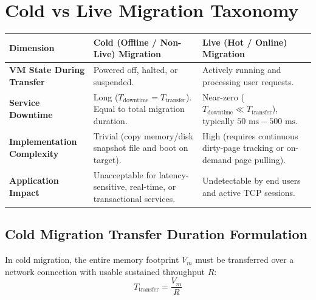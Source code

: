 \section{Cold vs Live Migration Taxonomy}
\begin{center}
\begin{tabularx}{\textwidth}{>{\bfseries}l X X}
\toprule
Dimension & Cold (Offline / Non-Live) Migration & Live (Hot / Online) Migration\\
\midrule
VM State During Transfer & Powered off, halted, or suspended. & Actively running and processing user requests.\\
Service Downtime & Long ($T_{\text{downtime}} = T_{\text{transfer}}$). Equal to total migration duration. & Near-zero ($T_{\text{downtime}} \ll T_{\text{transfer}}$), typically $50\text{ ms} - 500\text{ ms}$.\\
Implementation Complexity & Trivial (copy memory/disk snapshot file and boot on target). & High (requires continuous dirty-page tracking or on-demand page pulling).\\
Application Impact & Unacceptable for latency-sensitive, real-time, or transactional services. & Undetectable by end users and active TCP sessions.\\
\bottomrule
\end{tabularx}
\end{center}

\subsection{Cold Migration Transfer Duration Formulation}
In cold migration, the entire memory footprint $V_m$ must be transferred over a network connection with usable sustained throughput $R$:
\begin{equation}
T_{\text{transfer}} = \frac{V_m}{R}
\end{equation}

